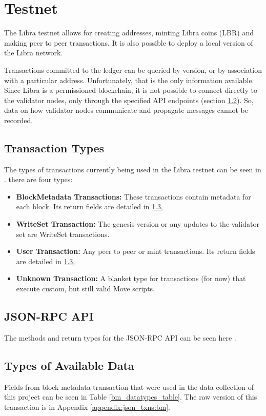 \documentclass[12pt,openany,a4paper]{book}
\begin{document}
\section{Testnet}
\label{__lb:testnet}
The Libra testnet allows for creating addresses, minting Libra coins (LBR) 
and making peer to peer transactions. It is also possible to deploy a local version 
of the Libra network.

Transactions committed to the ledger can be queried by version, or by association with a 
particular address. Unfortunately, that is the only information available.
Since Libra is a permissioned blockchain, it is not possible to connect directly 
to the validator nodes, only through the specified API endpoints (section \ref{json_api}).
So, data on how validator nodes communicate and propagate messages cannot be recorded.

\subsection{Transaction Types}
The types of transactions currently being used in the Libra testnet can be seen
in \cite{libra_jsonrpc_spec}. there are four types:
\begin{itemize}
    \item \textbf{BlockMetadata Transactions:} These transactions contain metadata for each block.
    Its return fields are detailed in \ref{available_data},
    \item \textbf{WriteSet Transaction:} The genesis version or any updates to the validator set are WriteSet transactions.
    \item \textbf{User Transaction:} Any peer to peer or mint transactions. Its return fields are detailed in \ref{available_data},
    \item \textbf{Unknown Transaction:} A blanket type for transactions (for now) that execute custom, but still valid Move scripts.
\end{itemize}



\subsection{JSON-RPC API}
\label{json_api}
The methods and return types for the JSON-RPC API can be seen here \cite{libra_jsonrpc_spec}.

\subsection{Types of Available Data}
\label{available_data}
Fields from block metadata transaction that were used in the data collection of this project 
can be seen in Table \ref{bm_datatypes_table}. The raw version of this transaction is 
in Appendix \ref{appendix:json_txns:bm}.
\end{document}
